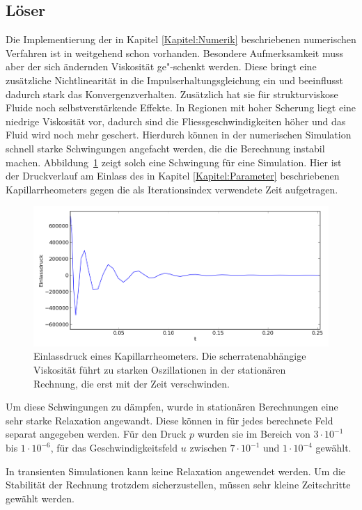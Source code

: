 \subsection{Löser}
Die Implementierung der in Kapitel \ref{Kapitel:Numerik} beschriebenen numerischen Verfahren ist in \openfoam{} weitgehend schon vorhanden.
Besondere Aufmerksamkeit muss aber der sich ändernden Viskosität ge"-schenkt werden. Diese bringt eine zusätzliche Nichtlinearität in die Impulserhaltungsgleichung ein und beeinflusst dadurch stark das Konvergenzverhalten. Zusätzlich hat sie für strukturviskose Fluide noch selbstverstärkende Effekte. In Regionen mit hoher Scherung liegt eine niedrige Viskosität vor, dadurch sind die Fliessgeschwindigkeiten höher und das Fluid wird noch mehr geschert. Hierdurch können in der numerischen Simulation schnell starke Schwingungen angefacht werden, die die Berechnung instabil machen.
Abbildung~\ref{fig:oszPress} zeigt solch eine Schwingung für eine Simulation. Hier ist der Druckverlauf am Einlass des in Kapitel \ref{Kapitel:Parameter} beschriebenen Kapillarrheometers gegen die als Iterationsindex verwendete Zeit aufgetragen.
%
\begin{figure}
    \includegraphics[width=\textwidth]{figures/schwankenderDruck.png}
    \caption{Einlassdruck eines Kapillarrheometers. Die scherratenabhängige Viskosität führt zu starken Oszillationen in der stationären Rechnung, die erst mit der Zeit verschwinden.}
    \label{fig:oszPress}
\end{figure}
%
Um diese Schwingungen zu dämpfen, wurde in stationären Berechnungen eine sehr starke Relaxation angewandt. Diese können in \openfoam{} für jedes berechnete Feld separat angegeben werden. Für den Druck $p$ wurden sie im Bereich von $3\cdot10^{-1}$ bis $1\cdot10^{-6}$, für das Geschwindigkeitsfeld $u$ zwischen $7\cdot10^{-1}$ und $1\cdot10^{-4}$ gewählt.

In transienten Simulationen kann keine Relaxation angewendet werden. Um die Stabilität der Rechnung trotzdem sicherzustellen, müssen sehr kleine Zeitschritte gewählt werden.
%
